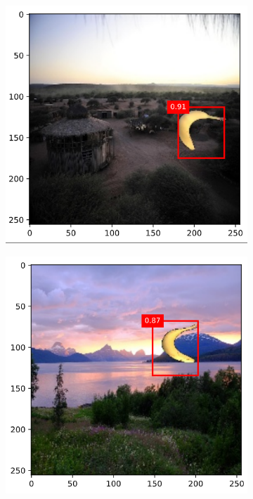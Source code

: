 \documentclass{article}
\begin{document}
\begin{figure}[ht!]
    \centering
    \begin{subfigure}[b]{0.45\linewidth}
    \includegraphics[width = \linewidth]{Screenshot 2023-05-26 213119.png}
    \label{fig8a}
    \end{subfigure}
    \begin{subfigure}[b]{0.45\linewidth}
        \includegraphics[width = \linewidth]{Screenshot 2023-05-26 213145.png}

\end{subfigure}
\end{figure}
\end{document}

